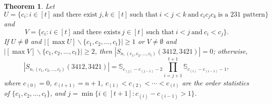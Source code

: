 \documentclass[11pt]{article}
\newtheorem{theorem}{Theorem}[section]
\theoremstyle{definition}
\numberwithin{equation}{section}
\begin{document}
\begin{theorem}
    Let
    \[
    U=\{c_i:i\in[t]~\text{and there exist}~j,k\in[t]~\text{such that}~i<j<k~\text{and}~c_ic_jc_k~\text{is a 231 pattern}\}
    \]
    and
    \[
    V=\{c_i:i\in[t]~\text{and there exists}~j\in[t]~\text{such that}~i<j~\text{and}~c_i<c_j\}.
    \]
    If $U\neq\emptyset$ and $\left|[\max U]\backslash\{c_1,c_2,\ldots,c_t\}\right|\geq1$ or $V\neq\emptyset$ and $\left|[\max V]\backslash\{c_1,c_2,\ldots,c_t\}\right|\geq2$, then $|S_{n,(c_1,c_2,\ldots,c_t)}(3412,3421)|=0$; otherwise,
\[
|S_{n,(c_1,c_2,\ldots,c_t)}(3412,3421)|=\mathbb{S}_{c_{(j)}-c_{(j-1)}-2}\prod_{i=j+1}^{t+1}\mathbb{S}_{c_{(i)}-c_{(i-1)}-1},
\]
where $c_{(0)}=0$, $c_{(t+1)}=n+1$, $c_{(1)}<c_{(2)}<\cdots<c_{(t)}$ are the order statistics of $\{c_1,c_2,\ldots,c_t\}$, and $j=\min\{i\in[t+1]:c_{(i)}-c_{(i-1)}>1\}$.
\end{theorem}
\end{document}
